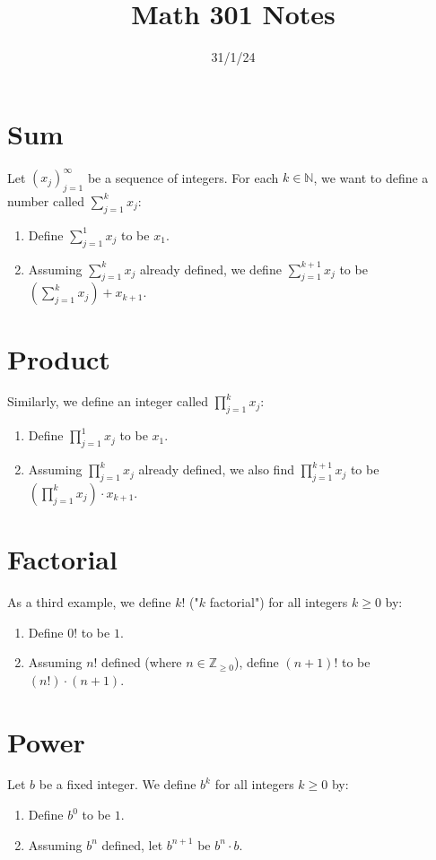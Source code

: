 \documentclass{article}
\begin{document}
\title{Math 301 Notes}
\date{31/1/24}
\maketitle

\section*{Sum}
Let $(x_j)_{j=1}^{\infty}$ be a sequence of integers. For each $k \in \mathbb{N}$, we want to define a number called $\sum_{j=1}^{k} x_j$:
\begin{enumerate}
  \item Define $\sum_{j=1}^{1} x_j$ to be $x_1$.
  \item Assuming $\sum_{j=1}^{k} x_j$ already defined, we define $\sum_{j=1}^{k+1} x_j$ to be $\left(\sum_{j=1}^{k} x_j\right) + x_{k+1}$.
\end{enumerate}

\section*{Product}
Similarly, we define an integer called $\prod_{j=1}^{k} x_j$:
\begin{enumerate}
  \item Define $\prod_{j=1}^{1} x_j$ to be $x_1$.
  \item Assuming $\prod_{j=1}^{k} x_j$ already defined, we also find $\prod_{j=1}^{k+1} x_j$ to be $\left(\prod_{j=1}^{k} x_j\right) \cdot x_{k+1}$.
\end{enumerate}

\section*{Factorial}
As a third example, we define $k!$ ("$k$ factorial") for all integers $k \geq 0$ by:
\begin{enumerate}
  \item Define $0!$ to be $1$.
  \item Assuming $n!$ defined (where $n \in \mathbb{Z}_{\geq 0}$), define $(n+1)!$ to be $(n!) \cdot (n+1)$.
\end{enumerate}

\section*{Power}
Let $b$ be a fixed integer. We define $b^k$ for all integers $k \geq 0$ by:
\begin{enumerate}
  \item Define $b^0$ to be $1$.
  \item Assuming $b^n$ defined, let $b^{n+1}$ be $b^n \cdot b$.
\end{enumerate}
\end{document}
